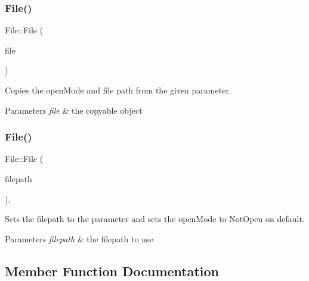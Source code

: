 \subsubsection{\texorpdfstring{File()}{File()}\hspace{0.1cm}{\footnotesize\ttfamily [1/2]}}
{\footnotesize\ttfamily File\+::\+File (\begin{DoxyParamCaption}\item[{const \mbox{\hyperlink{class_file}{File}} \&}]{file }\end{DoxyParamCaption})}



Copies the open\+Mode and file path from the given parameter. 


\begin{DoxyParams}{Parameters}
{\em file} & the copyable object \\
\hline
\end{DoxyParams}
\mbox{\label{class_file_a2cc4f22d64e80a380dbd04141b772080}} 
\subsubsection{\texorpdfstring{File()}{File()}\hspace{0.1cm}{\footnotesize\ttfamily [2/2]}}
{\footnotesize\ttfamily File\+::\+File (\begin{DoxyParamCaption}\item[{const \mbox{\hyperlink{class_a_string}{A\+String}} \&}]{filepath }\end{DoxyParamCaption})\hspace{0.3cm}{\ttfamily [explicit]}, {\ttfamily [noexcept]}}



Sets the filepath to the parameter and sets the open\+Mode to Not\+Open on default. 


\begin{DoxyParams}{Parameters}
{\em filepath} & the filepath to use \\
\hline
\end{DoxyParams}


\subsection{Member Function Documentation}
\mbox{\label{class_file_a7598c356f21d695e7e69fc523500588a}} 
